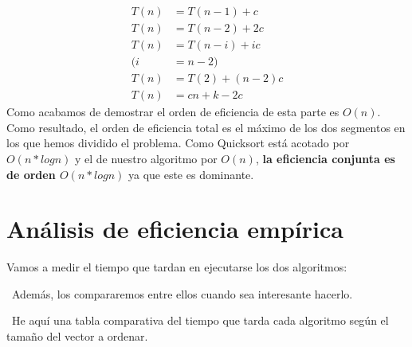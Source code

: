 \documentclass{article}
\begin{document}
\begin{align*}
	T(n) &= T(n-1) + c \\
	T(n) &= T(n-2) + 2c \\
	T(n) &= T(n-i) + ic \\
		(i &= n - 2) \\
	T(n) &= T(2) + (n-2)c \\
	T(n) &= cn + k - 2c
\end{align*}
Como acabamos de demostrar el orden de eficiencia de esta parte es $O(n)$.
	Como resultado, el orden de eficiencia total es el máximo de los dos segmentos en los que hemos dividido el problema. Como Quicksort está acotado por $O(n*log n)$ y el de
nuestro algoritmo por $O(n)$, \textbf{la eficiencia conjunta es de orden $O(n*log n)$} ya que este es 
dominante.
	\section{Análisis de eficiencia empírica}
	Vamos a medir el tiempo que tardan en ejecutarse los dos algoritmos:
	
	\
	Además, los compararemos entre ellos cuando sea interesante hacerlo.
	
	\
	He aquí una tabla comparativa del tiempo que tarda cada algoritmo según el tamaño del vector a ordenar.
	
\end{document}
